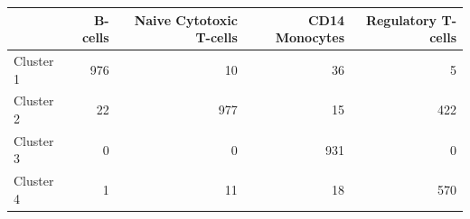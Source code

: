 
\begin{tabular}{lrrrr}
\toprule
  & B-cells & Naive Cytotoxic T-cells & CD14 Monocytes & Regulatory T-cells\\
\midrule
Cluster 1 & 976 & 10 & 36 & 5\\
Cluster 2 & 22 & 977 & 15 & 422\\
Cluster 3 & 0 & 0 & 931 & 0\\
Cluster 4 & 1 & 11 & 18 & 570\\
\bottomrule
\end{tabular}
